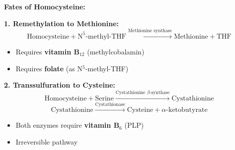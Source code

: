 \textbf{Fates of Homocysteine:}

\textbf{1. Remethylation to Methionine:}
\[
\text{Homocysteine} + \text{N}^5\text{-methyl-THF} \xrightarrow{\text{Methionine synthase}} \text{Methionine} + \text{THF}
\]
\begin{itemize}
    \item Requires \textbf{vitamin B$_{12}$} (methylcobalamin)
    \item Requires \textbf{folate} (as N$^5$-methyl-THF)
\end{itemize}

\textbf{2. Transsulfuration to Cysteine:}
\[
\text{Homocysteine} + \text{Serine} \xrightarrow{\text{Cystathionine } \beta\text{-synthase}} \text{Cystathionine}
\]
\[
\text{Cystathionine} \xrightarrow{\text{Cystathionase}} \text{Cysteine} + \alpha\text{-ketobutyrate}
\]
\begin{itemize}
    \item Both enzymes require \textbf{vitamin B$_6$} (PLP)
    \item Irreversible pathway
\end{itemize}

